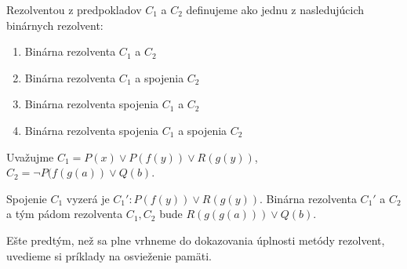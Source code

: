 \begin{definicia} 
    Rezolventou z predpokladov $C_1$ a $C_2$ definujeme ako jednu z
    nasledujúcich binárnych rezolvent:
    \begin{enumerate}
        \item Binárna rezolventa $C_1$ a $C_2$
        \item Binárna rezolventa $C_1$ a spojenia $C_2$
        \item Binárna rezolventa spojenia $C_1$ a $C_2$
        \item Binárna rezolventa spojenia $C_1$ a spojenia $C_2$
    \end{enumerate}
\end{definicia}

\begin{priklad}
    Uvažujme $C_1 = P(x) \lor P(f(y))\lor R(g(y))$,
             $C_2 = \neg P(f(g(a)) \lor Q(b)$.

    Spojenie $C_1$ vyzerá je $C_1': P(f(y)) \lor R(g(y))$.
    Binárna rezolventa $C_1'$ a $C_2$ a tým pádom rezolventa $C_1,C_2$
    bude $R(g(g(a))) \lor Q(b)$.
\end{priklad}

Ešte predtým, než sa plne vrhneme do dokazovania úplnosti metódy
rezolvent, uvedieme si príklady na osvieženie pamäti.

